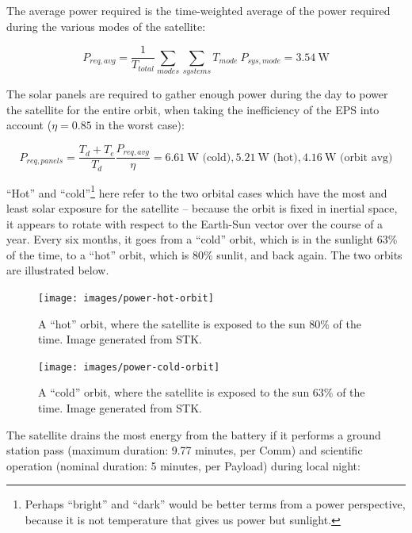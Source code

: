 \documentclass[12pt]{article}
\begin{document}
The average power required is the time-weighted average of the power required during the various modes of the satellite:

\begin{equation}
P_{req,avg} = \frac{1}{T_{total}}\sum_{modes}{ \sum_{systems}{T_{mode} \: P_{sys,mode}} } = 3.54 \ \text{W} 
\label{eq:power-required}
\end{equation}

The solar panels are required to gather enough power during the day to power the satellite for the entire orbit, when taking the inefficiency of the EPS into account ($\eta = 0.85$ in the worst case\cite{EPS manual}):

\begin{equation}
P_{req,panels} = \frac{T_d + T_e}{T_d}\frac{P_{req,avg}}{\eta} = 6.61 \ \text{W (cold)}, 5.21 \ \text{W (hot)}, 4.16 \ \text{W (orbit avg)}
\label{eq:power-required-panels}
\end{equation}

``Hot'' and ``cold''\footnote{Perhaps ``bright'' and ``dark'' would be better terms from a power perspective, because it is not temperature that gives us power but sunlight.} here refer to the two orbital cases which have the most and least solar exposure for the satellite – because the orbit is fixed in inertial space, it appears to rotate with respect to the Earth-Sun vector over the course of a year.  Every six months, it goes from a “cold” orbit, which is in the sunlight 63\% of the time, to a “hot” orbit, which is 80\% sunlit, and back again.  The two orbits are illustrated below.

\begin{figure}[ht]%
\centering
\texttt{[image: images/power-hot-orbit]}%
\caption{A ``hot'' orbit, where the satellite is exposed to the sun 80\% of the time.  Image generated from STK.}%
\label{fig:power-hot-orbit}%
\end{figure}

\begin{figure}[ht]%
\centering
\texttt{[image: images/power-cold-orbit]}%
\caption{A ``cold'' orbit, where the satellite is exposed to the sun 63\% of the time.  Image generated from STK.}%
\label{fig:power-cold-orbit}%
\end{figure}

The satellite drains the most energy from the battery if it performs a ground station pass (maximum duration: 9.77 minutes, per Comm) and scientific operation (nominal duration: 5 minutes, per Payload) during local night:
\end{document}
